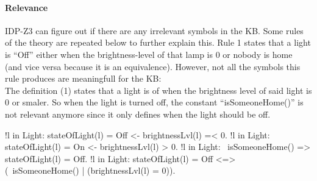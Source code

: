 \documentclass[11pt,a4paper]{report}
\begin{document}
\paragraph{Relevance}
IDP-Z3 can figure out if there are any irrelevant symbols in the KB. Some rules of the theory are repeated below to further explain this. Rule 1 states that a light is ``Off'' either when the brightness-level of that lamp is 0 or nobody is home (and vice versa because it is an equivalence). However, not all the symbols this rule produces are meaningfull for the KB:\\
The definition (1) states that a light is of when the brightness level of said light is 0 or smaler. So when the light is turned off, the constant ``isSomeoneHome()'' is not relevant anymore since it only defines when the light should be off. 

\begin{idplisting}
{
   !l in Light: stateOfLight(l) = Off <- brightnessLvl(l) =< 0.
   !l in Light: stateOfLight(l) = On <- brightnessLvl(l) > 0.
}
!l in Light: ~isSomeoneHome() => stateOfLight(l) = Off.
!l in Light: stateOfLight(l) = Off <=> (~isSomeoneHome() | (brightnessLvl(l) = 0)).
\end{idplisting}
\end{document}
